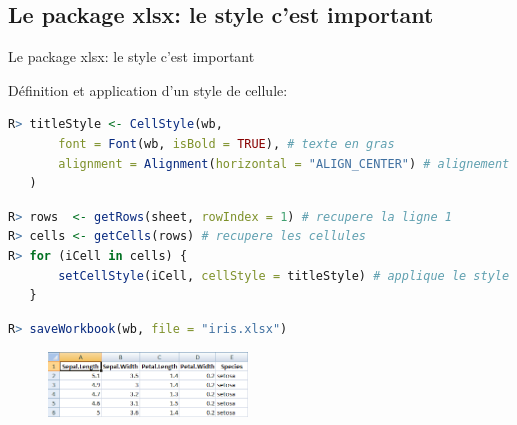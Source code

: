 \documentclass[10pt, xcolors={RGB}, hyperref={pdfpagelabels=false,
        colorlinks=true,
        linkcolor=black,
        urlcolor=black,
        citecolor=black,
        filecolor=black,
        menucolor=black,
        pdftex=true,
        bookmarks=true,
        bookmarksopen=true,
        hyperfootnotes=true}]{beamer}
\begin{document}
\subsection{Le package xlsx: le style c'est important}
\begin{frame}[containsverbatim]{Le package xlsx: le style c'est important}
\par{Définition et application d'un style de cellule:}
\vspace{-2ex}
\begin{lstlisting}[language=R]
R> titleStyle <- CellStyle(wb,
       font = Font(wb, isBold = TRUE), # texte en gras
       alignment = Alignment(horizontal = "ALIGN_CENTER") # alignement horizontal du texte
   )
\end{lstlisting}
\vspace{-2ex}
\begin{lstlisting}[language=R]
R> rows  <- getRows(sheet, rowIndex = 1) # recupere la ligne 1
R> cells <- getCells(rows) # recupere les cellules
R> for (iCell in cells) {
       setCellStyle(iCell, cellStyle = titleStyle) # applique le style a une cellule
   }
\end{lstlisting}
\vspace{-2ex}
\begin{lstlisting}[language=R]
R> saveWorkbook(wb, file = "iris.xlsx")
\end{lstlisting}
\vspace{1ex}
\begin{center}
    \begin{figure}
        \includegraphics[height=1.7cm, keepaspectratio]{figures/iris_xlsx_3.png}
    \end{figure}
\end{center}
\end{frame}
\end{document}
